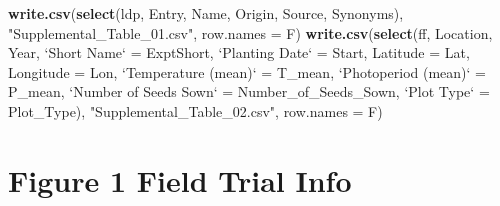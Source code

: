 \documentclass[
]{article}
\newenvironment{Shaded}{\begin{snugshade}}{\end{snugshade}}
\newcommand{\DataTypeTok}[1]{\textcolor[rgb]{0.13,0.29,0.53}{#1}}
\newcommand{\KeywordTok}[1]{\textcolor[rgb]{0.13,0.29,0.53}{\textbf{#1}}}
\newcommand{\NormalTok}[1]{#1}
\newcommand{\StringTok}[1]{\textcolor[rgb]{0.31,0.60,0.02}{#1}}
\begin{document}
\begin{Shaded}
\begin{Highlighting}[]
\KeywordTok{write.csv}\NormalTok{(}\KeywordTok{select}\NormalTok{(ldp, Entry, Name, Origin, Source, Synonyms), }
          \StringTok{"Supplemental_Table_01.csv"}\NormalTok{, }\DataTypeTok{row.names =}\NormalTok{ F)}
\KeywordTok{write.csv}\NormalTok{(}\KeywordTok{select}\NormalTok{(ff, Location, Year, }
            \StringTok{`}\DataTypeTok{Short Name}\StringTok{`}\NormalTok{ =}\StringTok{ }\NormalTok{ExptShort, }\StringTok{`}\DataTypeTok{Planting Date}\StringTok{`}\NormalTok{ =}\StringTok{ }\NormalTok{Start, }\DataTypeTok{Latitude =}\NormalTok{ Lat, }
            \DataTypeTok{Longitude =}\NormalTok{ Lon, }\StringTok{`}\DataTypeTok{Temperature (mean)}\StringTok{`}\NormalTok{ =}\StringTok{ }\NormalTok{T_mean, }\StringTok{`}\DataTypeTok{Photoperiod (mean)}\StringTok{`}\NormalTok{ =}\StringTok{ }\NormalTok{P_mean, }
            \StringTok{`}\DataTypeTok{Number of Seeds Sown}\StringTok{`}\NormalTok{ =}\StringTok{ }\NormalTok{Number_of_Seeds_Sown, }\StringTok{`}\DataTypeTok{Plot Type}\StringTok{`}\NormalTok{ =}\StringTok{ }\NormalTok{Plot_Type), }
          \StringTok{"Supplemental_Table_02.csv"}\NormalTok{, }\DataTypeTok{row.names =}\NormalTok{ F)}
\end{Highlighting}
\end{Shaded}

\hypertarget{figure-1-field-trial-info}{%
\section{Figure 1 Field Trial Info}\label{figure-1-field-trial-info}}
\end{document}
